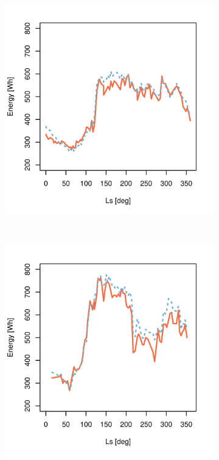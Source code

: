 \begin{figure}[h]
\begin{subfigure}[t]{\subfigureWidth}
  		\includegraphics[height=\graphicsHeight]{sections/power-and-energy-predictions/plots/predicted-vs-measured-energy-my30.png}
  		\label{fig:plot:sub:mer-energy-production-predicted-vs-reported-my30}
  	\end{subfigure}\\[0.8ex]
    \begin{subfigure}[t]{\subfigureWidth}
      \centering
  		\includegraphics[height=\graphicsHeight]{sections/power-and-energy-predictions/plots/predicted-vs-measured-energy-my32.png}

\end{subfigure}
\end{figure}
